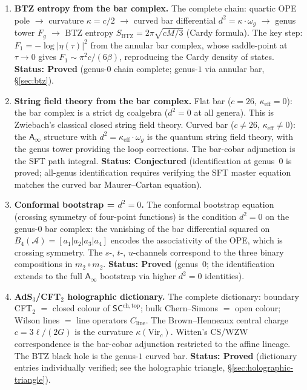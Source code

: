 \documentclass[11pt]{article}
\newcommand{\cA}{\mathcal{A}}
\newcommand{\Ainf}{\mathsf{A}_{\infty}}
\newcommand{\SCchtop}{\mathsf{SC}^{\mathrm{ch,top}}}
\begin{document}
\begin{enumerate}[label=\textbf{P\arabic*.},leftmargin=2.5em]

\item \textbf{BTZ entropy from the bar complex.}
The complete chain: quartic OPE pole $\to$ curvature
$\kappa = c/2$ $\to$ curved bar differential $d^2 = \kappa \cdot \omega_g$
$\to$ genus tower $F_g$ $\to$ BTZ entropy
$S_{\mathrm{BTZ}} = 2\pi\sqrt{cM/3}$ (Cardy formula).
The key step: $F_1 = -\log|\eta(\tau)|^2$ from the annular bar complex,
whose saddle-point at $\tau \to 0$ gives $F_1 \sim \pi^2 c / (6\beta)$,
reproducing the Cardy density of states.
\textbf{Status: Proved} (genus-$0$ chain complete; genus-$1$ via
annular bar, \S\ref{sec:btz}).

\item \textbf{String field theory from the bar complex.}
Flat bar ($c = 26$, $\kappa_{\mathrm{eff}} = 0$): the bar complex
is a strict dg coalgebra ($d^2 = 0$ at all genera).  This is
Zwiebach's classical closed string field theory.  Curved bar
($c \ne 26$, $\kappa_{\mathrm{eff}} \ne 0$): the $\Ainf$ structure
with $d^2 = \kappa_{\mathrm{eff}} \cdot \omega_g$ is the quantum
string field theory, with the genus tower providing the loop corrections.
The bar-cobar adjunction is the SFT path integral.
\textbf{Status: Conjectured} (identification at genus~$0$ is proved;
all-genus identification requires verifying the SFT master equation
matches the curved bar Maurer--Cartan equation).

\item \textbf{Conformal bootstrap = $d^2 = 0$.}
The conformal bootstrap equation (crossing symmetry of four-point
functions) is the condition $d^2 = 0$ on the genus-$0$ bar complex:
the vanishing of the bar differential squared on
$B_4(\cA) = [a_1 | a_2 | a_3 | a_4]$ encodes the associativity
of the OPE, which is crossing symmetry.  The $s$-, $t$-, $u$-channels
correspond to the three binary compositions in $m_2 \circ m_2$.
\textbf{Status: Proved} (genus~$0$; the identification extends to the
full $\Ainf$ bootstrap via higher $d^2 = 0$ identities).

\item \textbf{AdS$_3$/CFT$_2$ holographic dictionary.}
The complete dictionary: boundary CFT$_2$ $=$ closed colour of $\SCchtop$;
bulk Chern--Simons $=$ open colour; Wilson lines $=$ line operators
$C_{\mathrm{line}}$.  The Brown--Henneaux central charge
$c = 3\ell/(2G)$ is the curvature $\kappa(\mathrm{Vir}_c)$.
Witten's CS/WZW correspondence is the bar-cobar adjunction restricted
to the affine lineage.  The BTZ black hole is the genus-$1$ curved bar.
\textbf{Status: Proved} (dictionary entries individually verified;
see the holographic triangle, \S\ref{sec:holographic-triangle}).


\end{enumerate}
\end{document}
